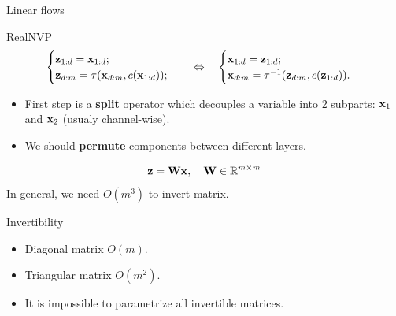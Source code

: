 \begin{frame}{Linear flows}
	\begin{block}{RealNVP}
		\vspace{-0.5cm}
		\begin{equation*}
			\begin{cases} \mathbf{z}_{1:d} = \mathbf{x}_{1:d}; \\ \mathbf{z}_{d:m} = \tau (\mathbf{x}_{d:m}, c(\mathbf{x}_{1:d}));\end{cases} 
			\quad \Leftrightarrow \quad 
			\begin{cases} \mathbf{x}_{1:d} = \mathbf{z}_{1:d}; \\ \mathbf{x}_{d:m} = \tau^{-1} (\mathbf{z}_{d:m}, c(\mathbf{z}_{1:d})).\end{cases}
		\end{equation*}
		\vspace{-0.2cm}
	\end{block}
	\begin{itemize}
		\item First step is a \textbf{split} operator which decouples a variable into 2 subparts: $\mathbf{x}_1$ and $\mathbf{x}_2$ (usualy channel-wise).
		\item We should \textbf{permute} components between different layers.
	\end{itemize}
	\[
	\mathbf{z} = \mathbf{W} \mathbf{x}, \quad \mathbf{W} \in \mathbb{R}^{m \times m}
	\]
	In general, we need $O(m^3)$ to invert matrix.
	\begin{block}{Invertibility}
		\begin{itemize}
			\item Diagonal matrix $O(m)$.
			\item Triangular matrix $O(m^2)$.
			\item It is impossible to parametrize all invertible matrices.
		\end{itemize}
	\end{block}
\end{frame}
